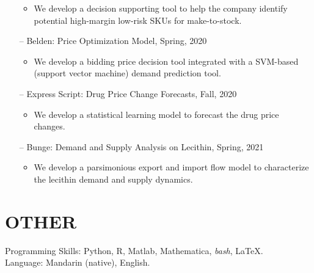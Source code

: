 \documentclass[margin]{res} %
\begin{document}
\begin{resume}
\begin{itemize}
            \begin{itemize}
                \item We develop a decision supporting tool to help the company identify potential high-margin low-risk SKUs for make-to-stock.
            \end{itemize}
        \item[--]Belden: Price Optimization Model, Spring, 2020
            \begin{itemize}
                \item We develop a bidding price decision tool integrated with a SVM-based (support vector machine) demand prediction tool.
            \end{itemize}
        \item[--]Express Script: Drug Price Change Forecasts, Fall, 2020
            \begin{itemize}
                \item We develop a statistical learning model to forecast the drug price changes.
            \end{itemize}
        \item[--]Bunge: Demand and Supply Analysis on Lecithin, Spring, 2021
            \begin{itemize}
                \item We develop a parsimonious export and import flow model to characterize the lecithin demand and supply dynamics.
            \end{itemize}
    \end{itemize}

\section{OTHER}
    Programming Skills: Python, R, Matlab, Mathematica, {\it bash}, \LaTeX.\\
    Language: Mandarin (native), English.


\end{resume}
\end{document}
